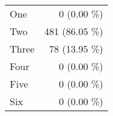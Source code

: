 \begin{tabular}{ l  r }
One & 0 (0.00 \%)\\
Two & 481 (86.05 \%)\\
Three & 78 (13.95 \%)\\
Four & 0 (0.00 \%)\\
Five & 0 (0.00 \%)\\
Six & 0 (0.00 \%)\\
\end{tabular}
